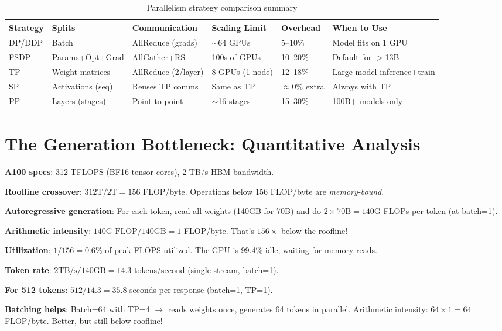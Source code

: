 \begin{table}[ht!]
\centering
\caption{Parallelism strategy comparison summary}
{\footnotesize
\begin{tabular}{@{}llllll@{}}
\toprule
\textbf{Strategy} & \textbf{Splits} & \textbf{Communication} & \textbf{Scaling Limit} & \textbf{Overhead} & \textbf{When to Use} \\
\midrule
DP/DDP & Batch & AllReduce (grads) & $\sim$64 GPUs & 5--10\% & Model fits on 1 GPU \\
FSDP & Params+Opt+Grad & AllGather+RS & 100s of GPUs & 10--20\% & Default for $>$13B \\
TP & Weight matrices & AllReduce (2/layer) & 8 GPUs (1 node) & 12--18\% & Large model inference+train \\
SP & Activations (seq) & Reuses TP comms & Same as TP & $\approx$0\% extra & Always with TP \\
PP & Layers (stages) & Point-to-point & $\sim$16 stages & 15--30\% & 100B+ models only \\
\bottomrule
\end{tabular}
}
\end{table}

\section{The Generation Bottleneck: Quantitative Analysis}
\label{the-generation-bottleneck-quantitative-analysis}

\begin{intuitionbox}
\textbf{A100 specs}: 312 TFLOPS (BF16 tensor cores), 2 TB/s HBM bandwidth.

\textbf{Roofline crossover}: $312\text{T} / 2\text{T} = 156$ FLOP/byte. Operations below 156 FLOP/byte are \emph{memory-bound}.

\textbf{Autoregressive generation}: For each token, read all weights (140GB for 70B) and do $2 \times 70\text{B} = 140\text{G}$ FLOPs per token (at batch=1).

\textbf{Arithmetic intensity}: $140\text{G FLOP} / 140\text{GB} = 1$ FLOP/byte. That’s $156\times$ below the roofline!

\textbf{Utilization}: $1/156 = 0.6\%$ of peak FLOPS utilized. The GPU is 99.4\% idle, waiting for memory reads.

\textbf{Token rate}: $2\text{TB/s} / 140\text{GB} = 14.3$ tokens/second (single stream, batch=1).

\textbf{For 512 tokens}: $512 / 14.3 = 35.8$ seconds per response (batch=1, TP=1).

\textbf{Batching helps}: Batch=64 with TP=4 $\rightarrow$ reads weights once, generates 64 tokens in parallel. Arithmetic intensity: $64 \times 1 = 64$ FLOP/byte. Better, but still below roofline!
\end{intuitionbox}

